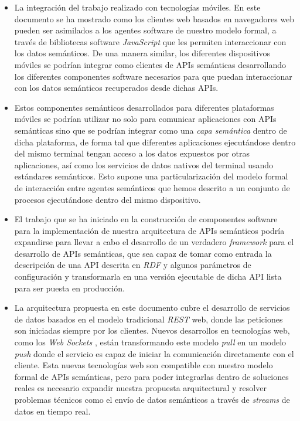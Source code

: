 \begin{itemize}
  \item La integraci\'on del trabajo realizado con tecnolog\'ias m\'oviles. En este documento se ha mostrado como los clientes web basados en navegadores web pueden ser asimilados a los agentes software de nuestro modelo formal, a trav\'es de bibliotecas software \textit{JavaScript} que les permiten interaccionar con los datos sem\'anticos. De una manera similar, los diferentes dispositivos m\'oviles se podr\'ian integrar como clientes de APIs sem\'anticas desarrollando los diferentes componentes software necesarios para que puedan interaccionar con los datos sem\'anticos recuperados desde dichas APIs. 
  \item Estos componentes sem\'anticos desarrollados para diferentes plataformas m\'oviles se podr\'ian utilizar no solo para comunicar aplicaciones con APIs sem\'anticas sino que se podr\'ian integrar como una \textit{capa sem\'antica} dentro de dicha plataforma, de forma tal que diferentes aplicaciones ejecut\'andose dentro del mismo terminal tengan acceso a los datos expuestos por otras aplicaciones, as\'i como los servicios de datos nativos del terminal usando est\'andares sem\'anticos. Esto supone una particularizaci\'on del modelo formal de interacci\'on entre agentes sem\'anticos que hemos descrito a un conjunto de procesos ejecut\'andose dentro del mismo dispositivo.
  \item El trabajo que se ha iniciado en la construcci\'on de componentes software para la implementaci\'on de nuestra arquitectura de APIs sem\'anticos podr\'ia expandirse para llevar a cabo el desarrollo de un verdadero \textit{framework} para el desarrollo de APIs sem\'anticas, que sea capaz de tomar como entrada la descripci\'on de una API descrita en \textit{RDF} y algunos par\'ametros de configuraci\'on y transformarla en una versi\'on ejecutable de dicha API lista para ser puesta en producci\'on.
  \item La arquitectura propuesta en este documento cubre el desarrollo de servicios de datos basados en el modelo tradicional \textit{REST} web, donde las peticiones son iniciadas siempre por los clientes. Nuevos desarrollos en tecnolog\'ias web, como los \textit{Web Sockets} \cite{hickson2011websocket}, est\'an transformando este modelo \textit{pull} en un modelo \textit{push} donde el servicio es capaz de iniciar la comunicaci\'on directamente con el cliente. Esta nuevas tecnolog\'ias web son compatible con nuestro modelo formal de APIs sem\'anticas, pero para poder integrarlas dentro de soluciones reales es necesario expandir nuestra propuesta arquitectural y resolver problemas t\'ecnicos como el env\'io de datos sem\'anticos a trav\'es de \textit{streams} de datos en tiempo real.

\end{itemize}
